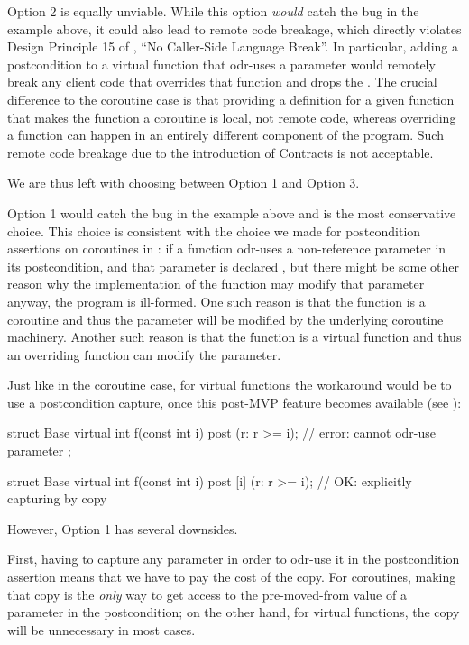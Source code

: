 Option 2 is equally unviable. While this option \emph{would} catch the bug in the example above, it could also lead to remote code breakage, which directly violates Design Principle 15 of \cite{P2900R10}, ``No Caller-Side Language Break''. In particular, adding a postcondition to a virtual function that odr-uses a  parameter would remotely break any client code that overrides that function and drops the . The crucial difference to the coroutine case is that providing a definition for a given function that makes the function a coroutine is local, not remote code, whereas overriding a function can happen in an entirely different component of the program. Such remote code breakage due to the introduction of Contracts is not acceptable.

We are thus left with choosing between Option 1 and Option 3.

Option 1 would catch the bug in the example above and is the most conservative choice. This choice is consistent with 
the choice we made for postcondition assertions on coroutines in \cite{P2900R10}: if a function odr-uses a non-reference parameter in its postcondition, and that parameter is declared , but there might be some other reason why the implementation of the function may modify that parameter anyway, the program is ill-formed. One such reason is that the function is a coroutine and thus the parameter will be modified by the underlying coroutine machinery. Another such reason is that the function is a virtual function and thus an overriding function can modify the parameter.

Just like in the coroutine case, for virtual functions the workaround would be to use a postcondition capture, once this post-MVP feature becomes available (see \cite{P3098R0}):
\begin{codeblock}
struct Base {
  virtual int f(const int i) post (r: r >= i);     // error: cannot odr-use parameter  
};

struct Base {
  virtual int f(const int i) post [i] (r: r >= i); // OK: explicitly capturing  by copy
}
\end{codeblock}

However, Option 1 has several downsides.

First, having to capture any parameter in order to odr-use it in the postcondition assertion means that we have to pay the cost of the copy. For coroutines, making that copy is the \emph{only} way to get access to the pre-moved-from value of a parameter in the postcondition; on the other hand, for virtual functions, the copy will be unnecessary in most cases. 

